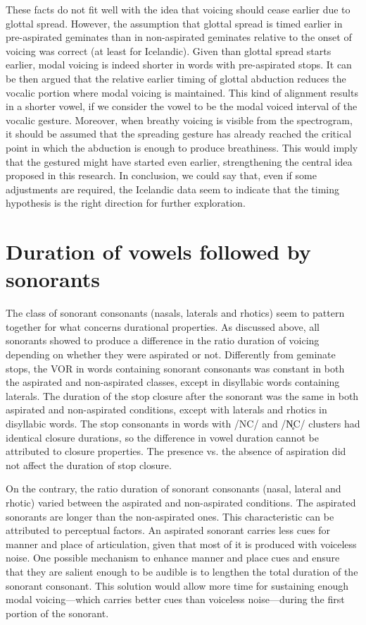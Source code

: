 \documentclass[11pt,a4paper,openany]{memoir}\usepackage[]{graphicx}\usepackage[]{color}
\begin{document}
These facts do not fit well with the idea that voicing should cease earlier due to glottal spread.
However, the assumption that glottal spread is timed earlier in pre-aspirated geminates than in non-aspirated geminates relative to the onset of voicing was correct (at least for Icelandic).
Given than glottal spread starts earlier, modal voicing is indeed shorter in words with pre-aspirated stops.
It can be then argued that the relative earlier timing of glottal abduction reduces the vocalic portion where modal voicing is maintained.
This kind of alignment results in a shorter vowel, if we consider the vowel to be the modal voiced interval of the vocalic gesture.
Moreover, when breathy voicing is visible from the spectrogram, it should be assumed that the spreading gesture has already reached the critical point in which the abduction is enough to produce breathiness.
This would imply that the gestured might have started even earlier, strengthening the central idea proposed in this research.
In conclusion, we could say that, even if some adjustments are required, the Icelandic data seem to indicate that the timing hypothesis is the right direction for further exploration.


\section{Duration of vowels followed by sonorants}

The class of sonorant consonants (nasals, laterals and rhotics) seem to pattern together for what concerns durational properties.
As discussed above, all sonorants showed to produce a difference in the ratio duration of voicing depending on whether they were aspirated or not.
Differently from geminate stops, the VOR in words containing sonorant consonants was constant in both the aspirated and non-aspirated classes, except in disyllabic words containing laterals.
The duration of the stop closure after the sonorant was the same in both aspirated and non-aspirated conditions, except with laterals and rhotics in disyllabic words.
The stop consonants in words with /NC/ and /N̥C/ clusters had identical closure durations, so the difference in vowel duration cannot be attributed to closure properties.
The presence vs. the absence of aspiration did not affect the duration of stop closure.

On the contrary, the ratio duration of sonorant consonants (nasal, lateral and rhotic) varied between the aspirated and non-aspirated conditions.
The aspirated sonorants are longer than the non-aspirated ones.
This characteristic can be attributed to perceptual factors.
An aspirated sonorant carries less cues for manner and place of articulation, given that most of it is produced with voiceless noise.
One possible mechanism to enhance manner and place cues and ensure that they are salient enough to be audible is to lengthen the total duration of the sonorant consonant.
This solution would allow more time for sustaining enough modal voicing---which carries better cues than voiceless noise---during the first portion of the sonorant.
\end{document}

